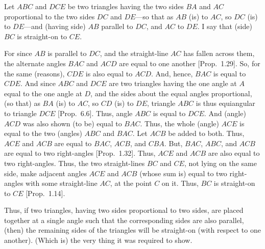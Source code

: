 \begin{Parallel}{}{}
{\epsfysize=2in
\centerline{}

Let $ABC$ and $DCE$ be two triangles having the two sides $BA$ and $AC$
proportional to the two sides $DC$ and $DE$---so that as $AB$ (is) to $AC$, so
$DC$ (is) to $DE$---and (having side) $AB$ parallel to $DC$, and $AC$ to $DE$. I say that (side) $BC$
is straight-on to $CE$.

For since $AB$ is parallel to $DC$, and the straight-line $AC$ has fallen across them, the alternate angles $BAC$ and $ACD$ are equal to one another  [Prop.~1.29]. So, for the same (reasons), $CDE$ is also equal to $ACD$. 
And, hence, $BAC$ is equal to $CDE$. And since $ABC$ and $DCE$ are two triangles
having the one angle at $A$ equal to the one angle at $D$, and the sides about the
equal angles proportional, (so that) as $BA$ (is) to $AC$, so $CD$ (is) to $DE$, triangle $ABC$ is thus equiangular to triangle $DCE$ [Prop.~6.6].  Thus, angle $ABC$ is equal to $DCE$.
And (angle) $ACD$ was also shown (to be) equal to $BAC$. Thus, the whole
(angle) $ACE$ is equal to the two (angles) $ABC$ and $BAC$. Let $ACB$ 
be added to both. Thus, $ACE$ and $ACB$ are equal to $BAC$, $ACB$,  and
$CBA$. But, $BAC$, $ABC$, and $ACB$ are equal to two right-angles  [Prop.~1.32]. Thus, $ACE$ and $ACB$ are also equal to two right-angles.
Thus, the two straight-lines $BC$ and $CE$, not lying on the same side, 
make  adjacent angles $ACE$ and $ACB$ (whose sum is) equal to two right-angles with some straight-line $AC$,  at the
point $C$ on it. Thus, $BC$ is straight-on to
$CE$  [Prop.~1.14].

Thus, if  two triangles,
having two sides proportional to two sides, are placed together at a single angle such that the corresponding 
sides are also parallel, (then) the remaining sides of the triangles will
be straight-on (with respect to one another). (Which is) the very thing it
was required to show.}
\end{Parallel}

